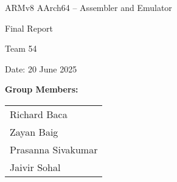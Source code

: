 \documentclass[11pt]{article}
\begin{document}
\begin{titlepage}
    \centering
    \vspace*{2cm}
    
    {\huge ARMv8 AArch64 – Assembler and Emulator\par}
    
    \vspace{1.5cm}
    
    {\LARGE Final Report\par}
    
    \vspace{0.5cm}
    
    
    \vfill %
    
    {\Large Team 54\par}
    
    \vspace{1cm}
    
    {\large Date: 20 June 2025\par}
    
    \vspace{1cm}
    
    \textbf{Group Members:}\\
    \begin{large}
        \begin{tabular}{l}
            Richard Baca\\
            Zayan Baig\\
            Prasanna Sivakumar\\
            Jaivir Sohal\\
        \end{tabular}
    \end{large}

    \vspace*{2cm}
    
\end{titlepage}

\newpage %

\tableofcontents
\newpage
\end{document}
